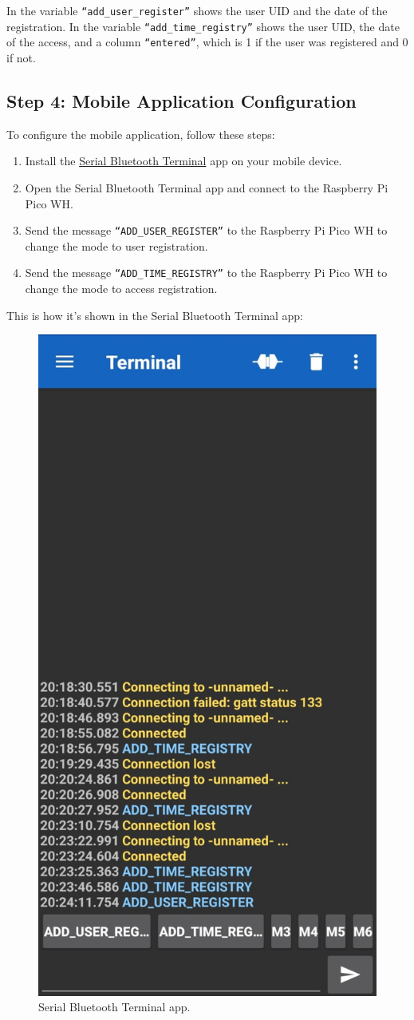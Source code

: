 \documentclass{article}
\begin{document}
In the variable \texttt{``add\_user\_register''} shows the user UID and the date of the registration.
In the variable \texttt{``add\_time\_registry''} shows the user UID, the date of the access, and a column \texttt{``entered''}, which is 1 if the user was registered and 0 if not.

\subsection{Step 4: Mobile Application Configuration}
To configure the mobile application, follow these steps:
\begin{enumerate}
    \item Install the \href{https://play.google.com/store/apps/details?id=de.kai_morich.serial_usb_terminal&pcampaignid=web_share}{Serial Bluetooth Terminal} app on your mobile device.
    \item Open the Serial Bluetooth Terminal app and connect to the Raspberry Pi Pico WH.
    \item Send the message \texttt{``ADD\_USER\_REGISTER''} to the Raspberry Pi Pico WH to change the mode to user registration.
    \item Send the message \texttt{``ADD\_TIME\_REGISTRY''} to the Raspberry Pi Pico WH to change the mode to access registration.
\end{enumerate}
This is how it's shown in the Serial Bluetooth Terminal app:
\begin{figure}[H]
    \centering
    \includegraphics[width=0.5\linewidth]{../images/serial_bluetooth_terminal.jpeg}
    \caption{\label{fig:serial_bluetooth_terminal}Serial Bluetooth Terminal app.}
\end{figure}
\end{document}
